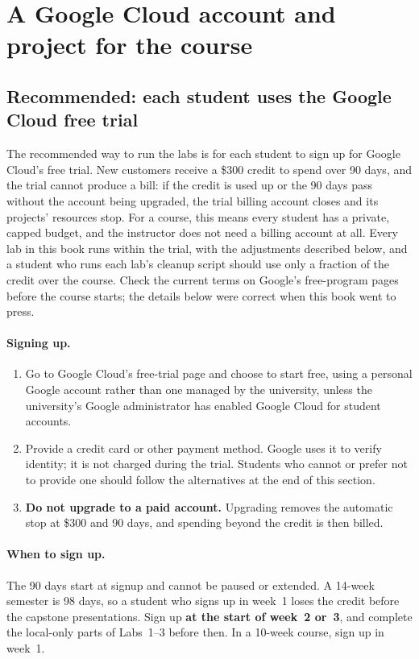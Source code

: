 \section{A Google Cloud account and project for the course}
\label{sec:app-account}

\subsection{Recommended: each student uses the Google Cloud free trial}

The recommended way to run the labs is for each student to sign up for Google Cloud's free trial. New customers receive a \$300 credit to spend over 90 days, and the trial cannot produce a bill: if the credit is used up or the 90 days pass without the account being upgraded, the trial billing account closes and its projects' resources stop. For a course, this means every student has a private, capped budget, and the instructor does not need a billing account at all. Every lab in this book runs within the trial, with the adjustments described below, and a student who runs each lab's cleanup script should use only a fraction of the credit over the course. Check the current terms on Google's free-program pages before the course starts; the details below were correct when this book went to press.

\paragraph{Signing up.}
\begin{enumerate}[itemsep=2pt]
  \item Go to Google Cloud's free-trial page and choose to start free, using a personal Google account rather than one managed by the university, unless the university's Google administrator has enabled Google Cloud for student accounts.
  \item Provide a credit card or other payment method. Google uses it to verify identity; it is not charged during the trial. Students who cannot or prefer not to provide one should follow the alternatives at the end of this section.
  \item \textbf{Do not upgrade to a paid account.} Upgrading removes the automatic stop at \$300 and 90 days, and spending beyond the credit is then billed.
\end{enumerate}

\paragraph{When to sign up.} The 90 days start at signup and cannot be paused or extended. A 14-week semester is 98 days, so a student who signs up in week~1 loses the credit before the capstone presentations. Sign up \textbf{at the start of week~2 or~3}, and complete the local-only parts of Labs~1--3 before then. In a 10-week course, sign up in week~1.

